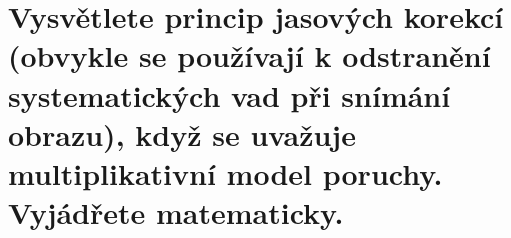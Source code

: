 \section{Vysvětlete princip jasových korekcí (obvykle se používají k odstranění systematických vad při snímání obrazu), 
když se uvažuje multiplikativní model poruchy. Vyjádřete matematicky.}